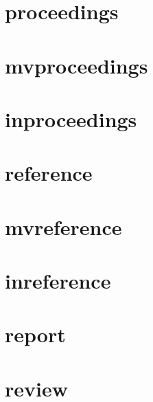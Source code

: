 \documentclass[a4paper]{article}
\begin{document}
\cite[1]{suppperiodical}

\cite[1]{suppperiodical}

\section{proceedings}

\cite[1]{proceedings}

\cite[1]{proceedings}

\section{mvproceedings}

\cite[1]{mvproceedings}

\cite[1]{mvproceedings}

\section{inproceedings}

\cite[1]{inproceedings}

\cite[1]{inproceedings}

\section{reference}

\cite[1]{reference}

\cite[1]{reference}

\section{mvreference}

\cite[1]{mvreference}

\cite[1]{mvreference}

\section{inreference}

\cite[1]{inreference}

\cite[1]{inreference}

\section{report}

\cite[1]{report}

\cite[1]{report}

\section{review}
\end{document}
